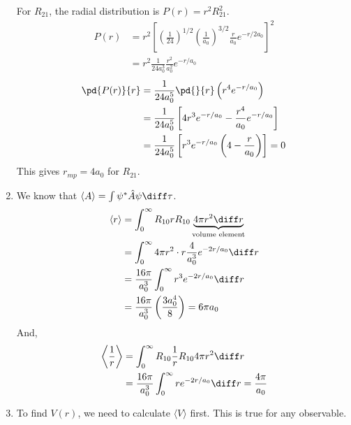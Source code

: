 \begin{solution}
\begin{enumerate}
              For $R_{21}$, the radial distribution is $P(r)=r^2R_{21}^2$.
              \begin{align*}
                  P(r) & =r^{2}\left[\left(\frac{1}{24}\right)^{1/2}\left(\frac{1}{a_{0}}\right)^{3/2}\frac{r}{a_{0}}e^{-r/2a_{0}}\right]^{2} \\
                       & =r^{2}\frac{1}{24a_{0}^{3}}\frac{r^{2}}{a_{0}^{2}}e^{-r/a_{0}}
              \end{align*}
              \begin{align*}
                  \pd{P(r)}{r} & =\frac{1}{24a_{0}^{5}}\pd{}{r}\left(r^{4}e^{-r/a_{0}}\right)                          \\
                               & =\frac{1}{24a_{0}^{5}}\left[4r^{3}e^{-r/a_{0}}-\frac{r^{4}}{a_{0}}e^{-r/a_{0}}\right] \\
                               & =\frac{1}{24a_{0}^{5}}\left[r^{3}e^{-r/a_{0}}\left(4-\frac{r}{a_{0}}\right)\right]=0
              \end{align*}
              This gives $r_{mp}=4a_0$ for $R_{21}$.
        \item We know that $\langle A\rangle=\int\psi^*\hat{A}\psi\diff\tau$.
              \begin{align*}
                  \langle r\rangle & =\int_0^\infty R_{10}rR_{10}\underbrace{4\pi r^2\diff r}_{\text{volume element}} \\
                                   & =\int_0^\infty 4\pi r^2\cdot r\frac{4}{a_0^3}e^{-2r/a_0}\diff r                  \\
                                   & =\frac{16\pi}{a_0^3}\int_0^\infty r^3e^{-2r/a_0}\diff r                          \\
                                   & =\frac{16\pi}{a_0^3}\left(\frac{3a_0^4}{8}\right)=6\pi a_0
              \end{align*}
              And,
              \begin{align*}
                  \left\langle\frac{1}{r}\right\rangle & =\int_0^\infty R_{10}\frac{1}{r}R_{10}4\pi r^2\diff r                  \\
                                                       & =\frac{16\pi}{a_0^3}\int_0^\infty re^{-2r/a_0}\diff r=\frac{4\pi}{a_0}
              \end{align*}
        \item To find $V(r)$, we need to calculate $\langle V\rangle$ first. This is true for any observable.
              \begin{align*}

\end{align*}
\end{enumerate}
\end{solution}
